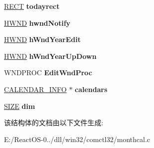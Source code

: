 \begin{DoxyCompactItemize}
\item 
\mbox{\label{struct_m_o_n_t_h_c_a_l___i_n_f_o_ac2c34c3b2d8670258cac87de0ed71bba}} 
\hyperlink{structtag_r_e_c_t}{R\+E\+CT} {\bfseries todayrect}
\item 
\mbox{\label{struct_m_o_n_t_h_c_a_l___i_n_f_o_ad84906624ec47dc9325e3dec96b1ceba}} 
\hyperlink{interfacevoid}{H\+W\+ND} {\bfseries hwnd\+Notify}
\item 
\mbox{\label{struct_m_o_n_t_h_c_a_l___i_n_f_o_a2b96ba5a2fd6837e8b384d4534ce084c}} 
\hyperlink{interfacevoid}{H\+W\+ND} {\bfseries h\+Wnd\+Year\+Edit}
\item 
\mbox{\label{struct_m_o_n_t_h_c_a_l___i_n_f_o_aa7803cbea4d5b33531b815d02ec60389}} 
\hyperlink{interfacevoid}{H\+W\+ND} {\bfseries h\+Wnd\+Year\+Up\+Down}
\item 
\mbox{\label{struct_m_o_n_t_h_c_a_l___i_n_f_o_add2f2d6ce9410f3bd344863a61ff73fe}} 
W\+N\+D\+P\+R\+OC {\bfseries Edit\+Wnd\+Proc}
\item 
\mbox{\label{struct_m_o_n_t_h_c_a_l___i_n_f_o_a0ded3b91cc75ece8071d2040f761d3ff}} 
\hyperlink{struct___c_a_l_e_n_d_a_r___i_n_f_o}{C\+A\+L\+E\+N\+D\+A\+R\+\_\+\+I\+N\+FO} $\ast$ {\bfseries calendars}
\item 
\mbox{\label{struct_m_o_n_t_h_c_a_l___i_n_f_o_a165997a366b780aa9eac23858fa66c3f}} 
\hyperlink{structtag_s_i_z_e}{S\+I\+ZE} {\bfseries dim}
\end{DoxyCompactItemize}


该结构体的文档由以下文件生成\+:\begin{DoxyCompactItemize}
\item 
E\+:/\+React\+O\+S-\/0../dll/win32/comctl32/monthcal.\+c\end{DoxyCompactItemize}
